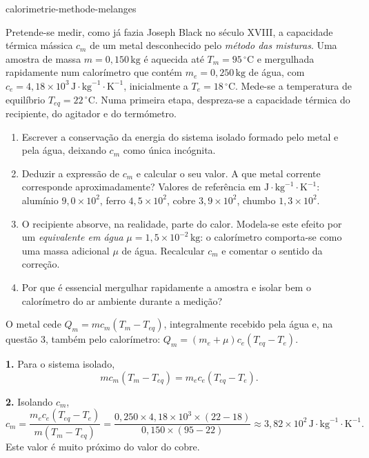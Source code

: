\begin{exo}{calorimetrie-methode-melanges}

Pretende-se medir, como já fazia Joseph Black no século XVIII, a capacidade térmica mássica $c_m$ de um metal desconhecido pelo \emph{método das misturas}. Uma amostra de massa $m=0{,}150\,\text{kg}$ é aquecida até $T_m=95\,^\circ\text{C}$ e mergulhada rapidamente num calorímetro que contém $m_e=0{,}250\,\text{kg}$ de água, com $c_e=4{,}18\times10^3\,\text{J}\!\cdot\!\text{kg}^{-1}\!\cdot\!\text{K}^{-1}$, inicialmente a $T_e=18\,^\circ\text{C}$. Mede-se a temperatura de equilíbrio $T_{eq}=22\,^\circ\text{C}$. Numa primeira etapa, despreza-se a capacidade térmica do recipiente, do agitador e do termómetro.

\begin{enumerate}
  \item Escrever a conservação da energia do sistema isolado formado pelo metal e pela água, deixando $c_m$ como única incógnita.
  \item Deduzir a expressão de $c_m$ e calcular o seu valor. A que metal corrente corresponde aproximadamente? Valores de referência em $\text{J}\!\cdot\!\text{kg}^{-1}\!\cdot\!\text{K}^{-1}$: alumínio $9{,}0\times10^2$, ferro $4{,}5\times10^2$, cobre $3{,}9\times10^2$, chumbo $1{,}3\times10^2$.
  \item O recipiente absorve, na realidade, parte do calor. Modela-se este efeito por um \emph{equivalente em água} $\mu=1{,}5\times10^{-2}\,\text{kg}$: o calorímetro comporta-se como uma massa adicional $\mu$ de água. Recalcular $c_m$ e comentar o sentido da correção.
  \item Por que é essencial mergulhar rapidamente a amostra e isolar bem o calorímetro do ar ambiente durante a medição?
\end{enumerate}

\begin{indication}
O metal cede $Q_m=mc_m(T_m-T_{eq})$, integralmente recebido pela água e, na questão 3, também pelo calorímetro: $Q_m=(m_e+\mu)c_e(T_{eq}-T_e)$.
\end{indication}

\begin{solution}
\textbf{1.} Para o sistema isolado,
\[
mc_m(T_m-T_{eq})=m_ec_e(T_{eq}-T_e).
\]

\textbf{2.} Isolando $c_m$,
\[
c_m=\frac{m_ec_e(T_{eq}-T_e)}{m(T_m-T_{eq})}
=\frac{0{,}250\times4{,}18\times10^3\times(22-18)}{0{,}150\times(95-22)}
\approx3{,}82\times10^2\,\text{J}\!\cdot\!\text{kg}^{-1}\!\cdot\!\text{K}^{-1}.
\]
Este valor é muito próximo do valor do cobre.


\end{solution}
\end{exo}
